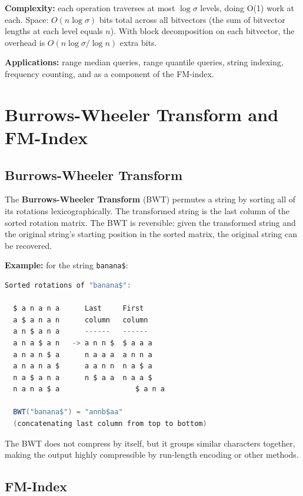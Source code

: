 \textbf{Complexity:} each operation traverses at most $\log \sigma$ levels, doing O(1) work at each. Space: $O(n \log \sigma)$ bits total across all bitvectors (the sum of bitvector lengths at each level equals $n$). With block decomposition on each bitvector, the overhead is $O(n \log \sigma / \log n)$ extra bits.

\textbf{Applications:} range median queries, range quantile queries, string indexing, frequency counting, and as a component of the FM-index.

\section{Burrows-Wheeler Transform and FM-Index}\label{sec22:bwt-fmindex}

\subsection{Burrows-Wheeler Transform}

The \textbf{Burrows-Wheeler Transform} (BWT) permutes a string by sorting all of its rotations lexicographically. The transformed string is the last column of the sorted rotation matrix. The BWT is reversible: given the transformed string and the original string's starting position in the sorted matrix, the original string can be recovered.

\textbf{Example:} for the string \texttt{banana\$}:

\begin{lstlisting}[language=Java]
  Sorted rotations of "banana$":

  $ a n a n a      Last     First
  a $ a n a n      column   column
  a n $ a n a      ------   ------
  a n a $ a n   -> a n n $  $ a a a
  a n a n $ a      n a a a  a n n a
  a n a n a $      a a n n  n a $ a
  n a $ a n a      n $ a a  n a a $
  n a n a $ a                  $ a n a

  BWT("banana$") = "annb$aa"
  (concatenating last column from top to bottom)
\end{lstlisting}

The BWT does not compress by itself, but it groups similar characters together, making the output highly compressible by run-length encoding or other methods.

\subsection{FM-Index}

